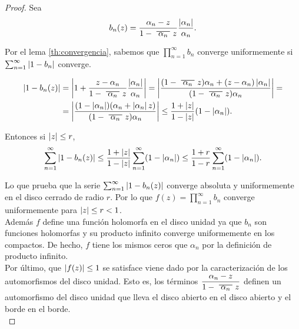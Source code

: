 \begin{proof}
    Sea
    \begin{equation*}
        b_n (z) = \frac{\alpha_n - z}{1 - \xbar{\alpha_n}z} \dfrac{\abs{\alpha_n}}{\alpha_n}.
    \end{equation*}

    Por el lema \ref{th:convergencia}, sabemos que $\prod_{n=1}^{\infty} b_n$ converge uniformemente si $\sum_{n=1}^{\infty} \left\lvert1 - b_n\right\rvert$ converge.

    \begin{equation*}
        \begin{split}
            \abs{1 - b_n(z)} & = \abs{1 + \dfrac{z - \alpha_n}{1 - \xbar{\alpha_n}z} \dfrac{\abs{\alpha_n}}{\alpha_n}} = \abs{\dfrac{(1 - \xbar{\alpha_n}z) \alpha_n + (z - \alpha_n) \abs{\alpha_n}}{(1 - \xbar{\alpha_n}z) \alpha_n}} = \\
                             & = \abs{ \dfrac{(1 - \abs{\alpha_n}) (\alpha_n + \abs{\alpha_n} z)}{(1 - \xbar{\alpha_n}z) \alpha_n}} \leq \dfrac{1 + \abs{z}}{1 - \abs{z}} (1 - \abs{\alpha_n}).
        \end{split}
    \end{equation*}

    Entonces si $\left\lvert z\right\rvert \leq r$,
    \begin{equation*}
        \sum_{n=1}^{\infty} \abs{1 - b_n(z)} \leq \dfrac{1 + \abs{z}}{1 - \abs{z}} \sum_{n=1}^{\infty} (1 - \abs{\alpha_n}) \leq \dfrac{1 + r}{1 - r} \sum_{n=1}^{\infty} (1 - \abs{\alpha_n}). %
    \end{equation*}

    Lo que prueba que la serie $\sum_{n=1}^{\infty} \left\lvert1 - b_n(z)\right\rvert$ converge absoluta y uniformemente en el disco cerrado de radio $r$. Por lo que $f(z) = \prod_{n=1}^{\infty} b_n$ converge uniformemente para $\left\lvert z\right\rvert \leq r < 1$. \\

    Además $f$ define una función holomorfa en el disco unidad ya que $b_n$ son funciones holomorfas y su producto infinito converge uniformemente en los compactos. De hecho, $f$ tiene los mismos ceros que $\alpha_n$ por la definición de producto infinito. \\

    Por último, que $\left\lvert f(z)\right\rvert \leq 1$ se satisface viene dado por la caracterización de los automorfismos del disco unidad. Esto es, los términos $\dfrac{\alpha_n - z}{1 - \xbar{\alpha_n}z}$ definen un automorfismo del disco unidad que lleva el disco abierto en el disco abierto y el borde en el borde. \\


\end{proof}
